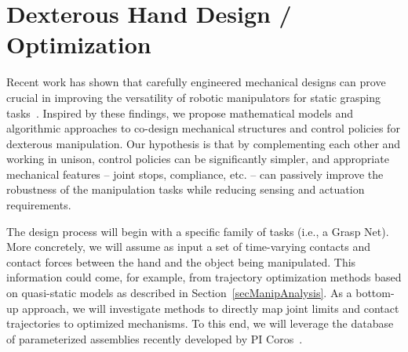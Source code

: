 \section{Dexterous Hand Design / Optimization}
  \label{secHandDesign}

\newcommand{\bA}{\mathbf{A}}
\newcommand{\bB}{\mathbf{B}}
\newcommand{\bC}{\mathbf{C}}
\newcommand{\bD}{\mathbf{D}}
\newcommand{\bE}{\mathbf{E}}
\newcommand{\bF}{\mathbf{F}}
\newcommand{\bG}{\mathbf{G}}
\newcommand{\bH}{\mathbf{H}}
\newcommand{\bI}{\mathbf{I}}
\newcommand{\bJ}{\mathbf{J}}
\newcommand{\bK}{\mathbf{K}}
\newcommand{\bM}{\mathbf{M}}
\newcommand{\bR}{\mathbf{R}}
\newcommand{\bU}{\mathbf{U}}
\newcommand{\ba}{\mathbf{a}}
\newcommand{\bb}{\mathbf{b}}
\newcommand{\bc}{\mathbf{c}}
\newcommand{\bd}{\mathbf{d}}
\newcommand{\be}{\mathbf{e}}
\newcommand{\bff}{\mathbf{f}}
\newcommand{\bg}{\mathbf{g}}
\newcommand{\bk}{\mathbf{k}}
\newcommand{\bm}{\mathbf{m}}
\newcommand{\bn}{\mathbf{n}}
\newcommand{\bp}{\mathbf{p}}
\newcommand{\bs}{\mathbf{s}}
\newcommand{\bt}{\mathbf{t}}
\newcommand{\bu}{\mathbf{u}}
\newcommand{\bv}{\mathbf{v}}
\newcommand{\bx}{\mathbf{x}}
\newcommand{\bl}{\mathbf{l}}
\newcommand{\bq}{\mathbf{q}}
\newcommand{\bw}{\vec{w}}
\newcommand{\bX}{\mathbf{X}}
\newcommand{\bS}{\mathbf{S}}
\newcommand{\bj}{\mathbf{j}}
\newcommand{\bT}{\mathbf{T}}
\newcommand{\bP}{\mathbf{P}}

\newcommand{\bbx}{\bar{\bx}}


Recent work has shown that carefully engineered mechanical designs can prove crucial in improving the versatility of robotic manipulators for static grasping tasks~\cite{Ciocarlie:2014:VGV:2674203.2674213}. Inspired by these findings, we propose mathematical models and algorithmic approaches to co-design mechanical structures and control policies for dexterous manipulation. Our hypothesis is that by complementing each other and working in unison, control policies can be significantly simpler, and appropriate mechanical features -- joint stops, compliance, etc. -- can passively improve the robustness of the manipulation tasks while reducing sensing and actuation requirements. 

The design process will begin with a specific family of tasks (i.e., a Grasp Net). More concretely, we will assume as input a set of time-varying contacts and contact forces between the hand and the object being manipulated. This information could come, for example, from trajectory optimization methods based on quasi-static models as described in Section~\ref{secManipAnalysis}. As a bottom-up approach, we will investigate methods to directly map joint limits and contact trajectories to optimized mechanisms. To this end, we will leverage the database of parameterized assemblies recently developed by PI Coros~\cite{Coros2013}. 

